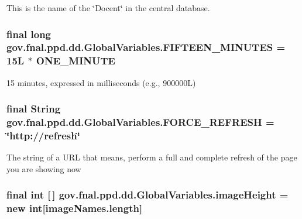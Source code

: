 This is the name of the \char`\"{}\-Docent\char`\"{} in the central database. \hypertarget{classgov_1_1fnal_1_1ppd_1_1dd_1_1GlobalVariables_ae09d2d42603daf3b4d5fccd1c489a93b}{
\subsubsection[{F\-I\-F\-T\-E\-E\-N\-\_\-\-M\-I\-N\-U\-T\-E\-S}]{\setlength{\rightskip}{0pt plus 5cm}final long gov.\-fnal.\-ppd.\-dd.\-Global\-Variables.\-F\-I\-F\-T\-E\-E\-N\-\_\-\-M\-I\-N\-U\-T\-E\-S = 15\-L $\ast$ O\-N\-E\-\_\-\-M\-I\-N\-U\-T\-E\hspace{0.3cm}{\ttfamily [static]}}}\label{classgov_1_1fnal_1_1ppd_1_1dd_1_1GlobalVariables_ae09d2d42603daf3b4d5fccd1c489a93b}
15 minutes, expressed in milliseconds (e.\-g., 900000\-L) \hypertarget{classgov_1_1fnal_1_1ppd_1_1dd_1_1GlobalVariables_a79c44481889ff937b51e30d13d9c1c35}{
\subsubsection[{F\-O\-R\-C\-E\-\_\-\-R\-E\-F\-R\-E\-S\-H}]{\setlength{\rightskip}{0pt plus 5cm}final String gov.\-fnal.\-ppd.\-dd.\-Global\-Variables.\-F\-O\-R\-C\-E\-\_\-\-R\-E\-F\-R\-E\-S\-H = \char`\"{}http\-://refresh\char`\"{}\hspace{0.3cm}{\ttfamily [static]}}}\label{classgov_1_1fnal_1_1ppd_1_1dd_1_1GlobalVariables_a79c44481889ff937b51e30d13d9c1c35}
The string of a U\-R\-L that means, perform a full and complete refresh of the page you are showing now \hypertarget{classgov_1_1fnal_1_1ppd_1_1dd_1_1GlobalVariables_a4c27cf0455687a5f58b71ae0d20fd671}{
\subsubsection[{image\-Height}]{\setlength{\rightskip}{0pt plus 5cm}final int \mbox{[}$\,$\mbox{]} gov.\-fnal.\-ppd.\-dd.\-Global\-Variables.\-image\-Height = new int\mbox{[}image\-Names.\-length\mbox{]}\hspace{0.3cm}{\ttfamily [static]}}}\label{classgov_1_1fnal_1_1ppd_1_1dd_1_1GlobalVariables_a4c27cf0455687a5f58b71ae0d20fd671}
